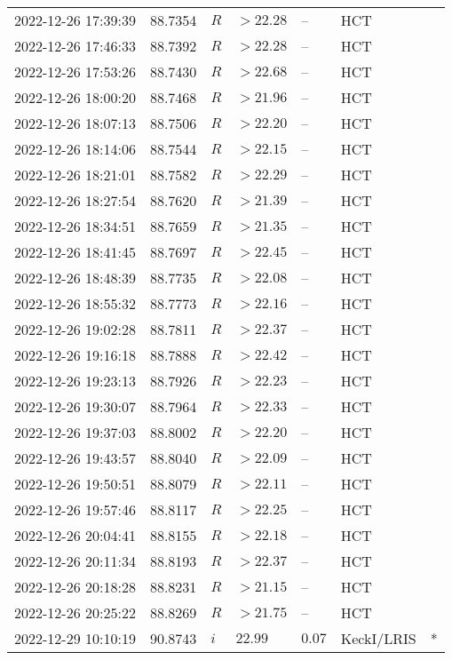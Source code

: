 \documentclass{nature_plusfigure}
\begin{document}
\begin{supplement}
\begin{center}
\begin{longtable}{lllllll}
2022-12-26 17:39:39 & 88.7354 & $R$ & $>22.28$ & -- & HCT &  \\ 
2022-12-26 17:46:33 & 88.7392 & $R$ & $>22.28$ & -- & HCT &  \\ 
2022-12-26 17:53:26 & 88.7430 & $R$ & $>22.68$ & -- & HCT &  \\ 
2022-12-26 18:00:20 & 88.7468 & $R$ & $>21.96$ & -- & HCT &  \\ 
2022-12-26 18:07:13 & 88.7506 & $R$ & $>22.20$ & -- & HCT &  \\ 
2022-12-26 18:14:06 & 88.7544 & $R$ & $>22.15$ & -- & HCT &  \\ 
2022-12-26 18:21:01 & 88.7582 & $R$ & $>22.29$ & -- & HCT &  \\ 
2022-12-26 18:27:54 & 88.7620 & $R$ & $>21.39$ & -- & HCT &  \\ 
2022-12-26 18:34:51 & 88.7659 & $R$ & $>21.35$ & -- & HCT &  \\ 
2022-12-26 18:41:45 & 88.7697 & $R$ & $>22.45$ & -- & HCT &  \\ 
2022-12-26 18:48:39 & 88.7735 & $R$ & $>22.08$ & -- & HCT &  \\ 
2022-12-26 18:55:32 & 88.7773 & $R$ & $>22.16$ & -- & HCT &  \\ 
2022-12-26 19:02:28 & 88.7811 & $R$ & $>22.37$ & -- & HCT &  \\ 
2022-12-26 19:16:18 & 88.7888 & $R$ & $>22.42$ & -- & HCT &  \\ 
2022-12-26 19:23:13 & 88.7926 & $R$ & $>22.23$ & -- & HCT &  \\ 
2022-12-26 19:30:07 & 88.7964 & $R$ & $>22.33$ & -- & HCT &  \\ 
2022-12-26 19:37:03 & 88.8002 & $R$ & $>22.20$ & -- & HCT &  \\ 
2022-12-26 19:43:57 & 88.8040 & $R$ & $>22.09$ & -- & HCT &  \\ 
2022-12-26 19:50:51 & 88.8079 & $R$ & $>22.11$ & -- & HCT &  \\ 
2022-12-26 19:57:46 & 88.8117 & $R$ & $>22.25$ & -- & HCT &  \\ 
2022-12-26 20:04:41 & 88.8155 & $R$ & $>22.18$ & -- & HCT &  \\ 
2022-12-26 20:11:34 & 88.8193 & $R$ & $>22.37$ & -- & HCT &  \\ 
2022-12-26 20:18:28 & 88.8231 & $R$ & $>21.15$ & -- & HCT &  \\ 
2022-12-26 20:25:22 & 88.8269 & $R$ & $>21.75$ & -- & HCT &  \\ 
2022-12-29 10:10:19 & 90.8743 & $i$ & $22.99$ & $0.07$ & KeckI/LRIS & * \\ 

\end{longtable}
\end{center}
\end{supplement}
\end{document}
